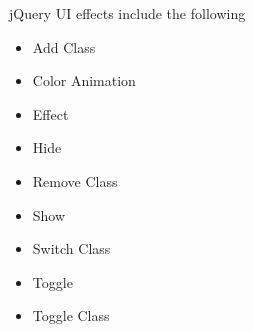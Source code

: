 \documentclass[11pt,a4paper]{article}
\begin{document}
jQuery UI effects include the following

\begin{itemize}
\item Add Class
\item Color Animation
\item Effect
\item Hide
\item Remove Class
\item Show
\item Switch Class
\item Toggle
\item Toggle Class

\end{itemize}
\end{document}
